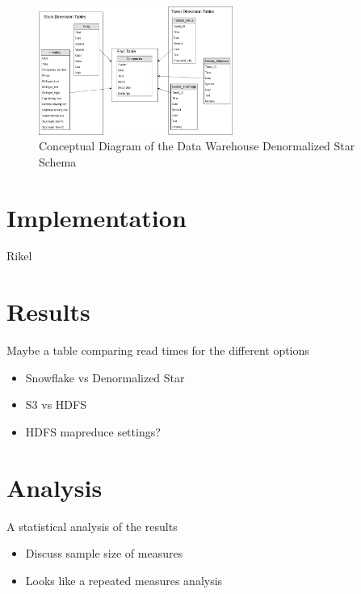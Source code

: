 \documentclass[journal]{IEEEtran}
\begin{document}
\begin{figure}
	\centering
	\includegraphics[width=2.5in]{Star_Conceptual_Schema.png}
	\caption{Conceptual Diagram of the Data Warehouse 
		Denormalized Star Schema}
	\label{star}
\end{figure}

\section{Implementation}

Rikel

\section{Results}

Maybe a table comparing read times for the different options

\begin{itemize}
	\item Snowflake vs Denormalized Star
	\item S3 vs HDFS
	\item HDFS mapreduce settings?
\end{itemize}

\section{Analysis}

A statistical analysis of the results

\begin{itemize}
	\item Discuss sample size of measures
	\item Looks like a repeated measures analysis
\end{itemize}
\end{document}

